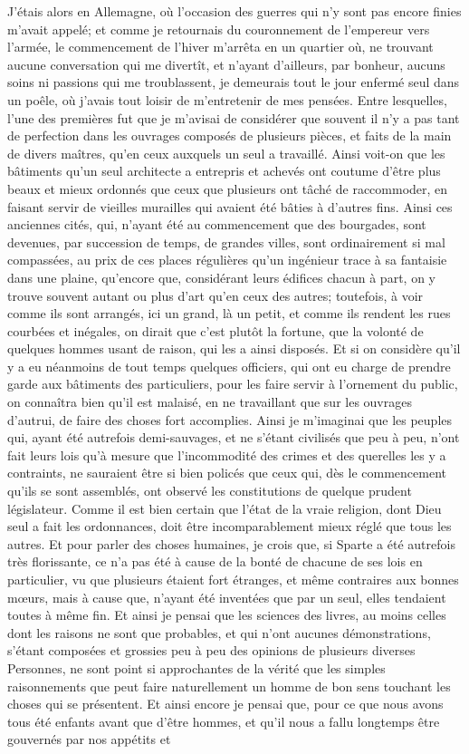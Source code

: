 \documentclass[french,twoside]{book} %
\newcommand\chaptercont{} %
\begin{document}
\chaptercont
\noindent J'étais alors en Allemagne, où l'occasion des guerres qui n'y sont pas encore finies m'avait appelé; et comme je retournais du couronnement de l'empereur vers l'armée, le commencement de l'hiver m'arrêta en un quartier où, ne trouvant aucune conversation qui me divertît, et n'ayant d'ailleurs, par bonheur, aucuns soins ni passions qui me troublassent, je demeurais tout le jour enfermé seul dans un poêle, où j'avais tout loisir de m'entretenir de mes pensées. Entre lesquelles, l'une des premières fut que je m'avisai de considérer que souvent il n'y a pas tant de perfection dans les ouvrages composés de plusieurs pièces, et faits de la main de divers maîtres, qu'en ceux auxquels un seul a travaillé. Ainsi voit-on que les bâtiments qu'un seul architecte a entrepris et achevés ont coutume d'être plus beaux et mieux ordonnés que ceux que plusieurs ont tâché de raccommoder, en faisant servir de vieilles murailles qui avaient été bâties à d'autres fins. Ainsi ces anciennes cités, qui, n'ayant été au commencement que des bourgades, sont devenues, par succession de temps, de grandes villes, sont ordinairement si mal compassées, au prix de ces places régulières qu'un ingénieur trace à sa fantaisie dans une plaine, qu'encore que, considérant leurs édifices chacun à part, on y trouve souvent autant ou plus d'art qu'en ceux des autres; toutefois, à voir comme ils sont arrangés, ici un grand, là un petit, et comme ils rendent les rues courbées et inégales, on dirait que c'est plutôt la fortune, que la volonté de quelques hommes usant de raison, qui les a ainsi disposés. Et si on considère qu'il y a eu néanmoins de tout temps quelques officiers, qui ont eu charge de prendre garde aux bâtiments des particuliers, pour les faire servir à l'ornement du public, on connaîtra bien qu'il est malaisé, en ne travaillant que sur les ouvrages d'autrui, de faire des choses fort accomplies. Ainsi je m'imaginai que les peuples qui, ayant été autrefois demi-sauvages, et ne s'étant civilisés que peu à peu, n'ont fait leurs lois qu'à mesure que l'incommodité des crimes et des querelles les y a contraints, ne sauraient être si bien policés que ceux qui, dès le commencement qu'ils se sont assemblés, ont observé les constitutions de quelque prudent législateur. Comme il est bien certain que l'état de la vraie religion, dont Dieu seul a fait les ordonnances, doit être incomparablement mieux réglé que tous les autres. Et pour parler des choses humaines, je crois que, si Sparte a été autrefois très florissante, ce n'a pas été à cause de la bonté de chacune de ses lois en particulier, vu que plusieurs étaient fort étranges, et même contraires aux bonnes mœurs, mais à cause que, n'ayant été inventées que par un seul, elles tendaient toutes à même fin. Et ainsi je pensai que les sciences des livres, au moins celles dont les raisons ne sont que probables, et qui n'ont aucunes démonstrations, s'étant composées et grossies peu à peu des opinions de plusieurs diverses Personnes, ne sont point si approchantes de la vérité que les simples raisonnements que peut faire naturellement un homme de bon sens touchant les choses qui se présentent. Et ainsi encore je pensai que, pour ce que nous avons tous été enfants avant que d'être hommes, et qu'il nous a fallu longtemps être gouvernés par nos appétits et 
\end{document}
